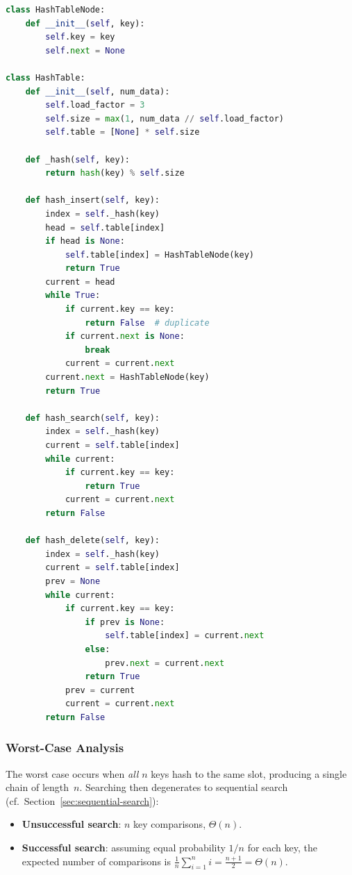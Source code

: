 \documentclass[11pt, a4paper, notitlepage]{report}
\theoremstyle{definition}
\theoremstyle{remark}
\theoremstyle{definition}
\begin{document}
\begin{lstlisting}[language=Python]
class HashTableNode:
    def __init__(self, key):
        self.key = key
        self.next = None

class HashTable:
    def __init__(self, num_data):
        self.load_factor = 3
        self.size = max(1, num_data // self.load_factor)
        self.table = [None] * self.size

    def _hash(self, key):
        return hash(key) % self.size

    def hash_insert(self, key):
        index = self._hash(key)
        head = self.table[index]
        if head is None:
            self.table[index] = HashTableNode(key)
            return True
        current = head
        while True:
            if current.key == key:
                return False  # duplicate
            if current.next is None:
                break
            current = current.next
        current.next = HashTableNode(key)
        return True

    def hash_search(self, key):
        index = self._hash(key)
        current = self.table[index]
        while current:
            if current.key == key:
                return True
            current = current.next
        return False

    def hash_delete(self, key):
        index = self._hash(key)
        current = self.table[index]
        prev = None
        while current:
            if current.key == key:
                if prev is None:
                    self.table[index] = current.next
                else:
                    prev.next = current.next
                return True
            prev = current
            current = current.next
        return False
\end{lstlisting}

\subsubsection{Worst-Case Analysis}
\label{subsubsec:chaining-worst}

The worst case occurs when \emph{all} $n$ keys hash to the same slot, producing
a single chain of length~$n$.  Searching then degenerates to sequential search
(cf.\ Section~\ref{sec:sequential-search}):

\begin{itemize}
  \item \textbf{Unsuccessful search}: $n$ key comparisons, $\Theta(n)$.
  \item \textbf{Successful search}: assuming equal probability $1/n$ for each
        key, the expected number of comparisons is
        $\frac{1}{n}\sum_{i=1}^{n} i = \frac{n+1}{2} = \Theta(n)$.
\end{itemize}
\end{document}
